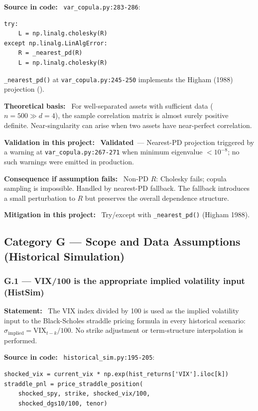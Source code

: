 \documentclass[11pt,a4paper]{article}
\newcommand{\asmfield}[1]{\medskip\noindent\textbf{#1:}\ }
\newcommand{\code}[1]{\texttt{#1}}
\newcommand{\validated}{\textbf{Validated}}
\begin{document}
\asmfield{Source in code}
\code{var\_copula.py:283-286}:
\begin{lstlisting}
try:
    L = np.linalg.cholesky(R)
except np.linalg.LinAlgError:
    R = _nearest_pd(R)
    L = np.linalg.cholesky(R)
\end{lstlisting}
\code{\_nearest\_pd()} at \code{var\_copula.py:245-250} implements the
Higham (1988) projection (\cite{Higham1988}).

\asmfield{Theoretical basis}
For well-separated assets with sufficient data ($n = 500 \gg d = 4$), the
sample correlation matrix is almost surely positive definite. Near-singularity
can arise when two assets have near-perfect correlation.

\asmfield{Validation in this project}
\validated\ --- Nearest-PD projection triggered by a warning at
\code{var\_copula.py:267-271} when minimum eigenvalue $< 10^{-8}$; no such
warnings were emitted in production.

\asmfield{Consequence if assumption fails}
Non-PD $R$: Cholesky fails; copula sampling is impossible. Handled by
nearest-PD fallback. The fallback introduces a small perturbation to $R$
but preserves the overall dependence structure.

\asmfield{Mitigation in this project}
Try/except with \code{\_nearest\_pd()} (Higham 1988).

\subsection{Category G --- Scope and Data Assumptions (Historical Simulation)}\label{sec:catG}

\subsubsection{G.1 --- VIX/100 is the appropriate implied volatility input (HistSim)}\label{asm:G1}

\asmfield{Statement}
The VIX index divided by 100 is used as the implied volatility input to the
Black-Scholes straddle pricing formula in every historical scenario:
$\sigma_{\text{implied}} = \text{VIX}_{t-k} / 100$. No strike adjustment
or term-structure interpolation is performed.

\asmfield{Source in code}
\code{historical\_sim.py:195-205}:
\begin{lstlisting}
shocked_vix = current_vix * np.exp(hist_returns['VIX'].iloc[k])
straddle_pnl = price_straddle_position(
    shocked_spy, strike, shocked_vix/100,
    shocked_dgs10/100, tenor)
\end{lstlisting}
\end{document}
